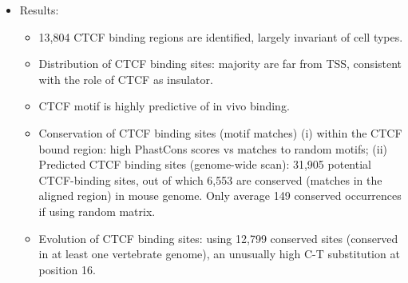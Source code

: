 \documentclass{report}
\begin{document}
\begin{enumerate}
\begin{itemize}
		\item Results:
		\begin{itemize}
			\item 13,804 CTCF binding regions are identified, largely invariant of cell types. 
			\item Distribution of CTCF binding sites: majority are far from TSS, consistent with the role of CTCF as insulator. 
			\item CTCF motif is highly predictive of in vivo binding. 
			\item Conservation of CTCF binding sites (motif matches) (i) within the CTCF bound region: high PhastCons scores vs matches to random motifs; (ii) Predicted CTCF binding sites (genome-wide scan): 31,905 potential CTCF-binding sites, out of which 6,553 are conserved (matches in the aligned region) in mouse genome. Only average 149 conserved occurrences if using random matrix. 
			\item Evolution of CTCF binding sites: using 12,799 conserved sites (conserved in at least one vertebrate genome), an unusually high C-T substitution at position 16. 
		\end{itemize}
	\end{itemize}
	
\end{enumerate}
\end{document}
